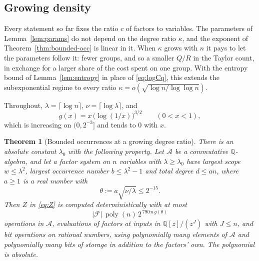 \documentclass[11pt,reqno]{amsart}
\numberwithin{equation}{section}
\theoremstyle{plain}
\newtheorem{theorem}{Theorem}[section]
\theoremstyle{definition}
\theoremstyle{remark}
\DeclareMathOperator{\poly}{poly}
\newcommand{\A}{\mathcal{A}}
\newcommand{\F}{\mathcal{F}}
\newcommand{\Q}{\mathbb{Q}}
\begin{document}
\subsection{Growing density}\label{ssec:density}
Every statement so far fixes the ratio $c$ of factors to variables. The
parameters of Lemma~\ref{lem:params} do not depend on the degree ratio
$\kappa$, and the exponent of Theorem~\ref{thm:bounded-occ} is linear in it.
When $\kappa$ grows with $n$ it pays to let the parameters follow it: fewer
groups, and so a smaller $Q/R$ in the Taylor count, in exchange for a larger
share of the cost spent on one group. With the entropy bound of
Lemma~\ref{lem:entropy} in place of \eqref{eq:logCq}, this extends the
subexponential regime to every ratio $\kappa=o(\sqrt{\log n/\log\log n})$.

Throughout, $\lambda=\lceil\log n\rceil$, $\nu=\lceil\log\lambda\rceil$, and
\[
  g(x)=x\,\bigl(\log(1/x)\bigr)^{3/2}\qquad(0<x<1),
\]
which is increasing on $(0,2^{-3}]$ and tends to $0$ with $x$.

\begin{theorem}[Bounded occurrences at a growing degree ratio]\label{thm:explicit}
There is an absolute constant $\lambda_0$ with the following property. Let $\A$
be a commutative $\Q$-algebra, and let a factor system on $n$ variables with
$\lambda\ge\lambda_0$ have largest scope $w\le\lambda^2$, largest occurrence
number $b\le\lambda^2-1$ and total degree $d\le an$, where $a\ge1$ is a
real number with
\[
  \theta:=a\sqrt{\nu/\lambda}\le2^{-15}.
\]
Then $Z$ in \eqref{eq:Z} is computed deterministically with at most
\begin{equation}\label{eq:explicit}
  |\F|\,\poly(n)\,2^{\,790\,n\,g(\theta)}
\end{equation}
operations in $\A$, evaluations of factors at inputs in $\Q[z]/(z^{J})$ with
$J\le n$, and bit operations on rational numbers, using polynomially many
elements of $\A$ and polynomially many bits of storage in addition to the
factors' own. The polynomial is absolute.
\end{theorem}
\end{document}
